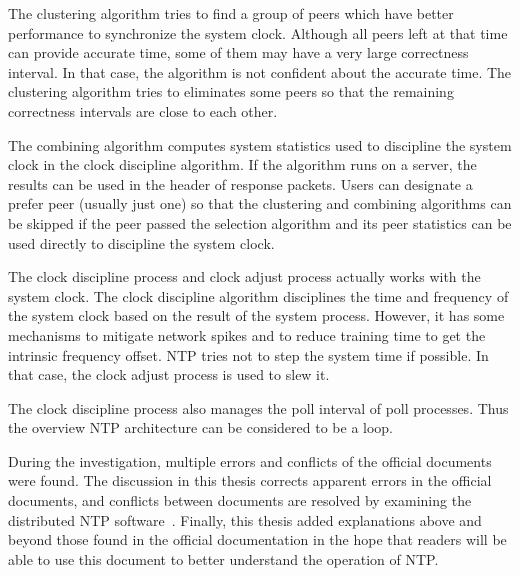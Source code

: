 The clustering algorithm tries to find a group of peers which have better
performance to synchronize the system clock. Although all peers left at that
time can provide accurate time, some of them may have a very large correctness
interval. In that case, the algorithm is not confident about the accurate time.
The clustering algorithm tries to eliminates some peers so that the remaining
correctness intervals are close to each other.

The combining algorithm computes system statistics used to discipline the system
clock in the clock discipline algorithm. If the algorithm runs on a server, the
results can be used in the header of response packets. Users can designate a
prefer peer (usually just one) so that the clustering and combining algorithms
can be skipped if the peer passed the selection algorithm and its peer
statistics can be used directly to discipline the system clock.

The clock discipline process and clock adjust process actually works with the
system clock. The clock discipline algorithm disciplines the time and frequency
of the system clock based on the result of the system process. However, it has some
mechanisms to mitigate network spikes and to reduce training time to get the intrinsic
frequency offset. NTP tries not to step the system time if possible. In that
case, the clock adjust process is used to slew it.

The clock discipline process also manages the poll interval of poll processes.
Thus the overview NTP architecture can be considered to be a loop.

During the investigation, multiple errors and conflicts of the official
documents were found. The discussion in this thesis corrects apparent errors in
the official documents, and conflicts between documents are resolved by
examining the distributed NTP software~\cite{source_code}. 
Finally, this thesis added explanations above and beyond those found in the
official documentation in the hope that readers will be able to use this
document to better understand the operation of NTP.

